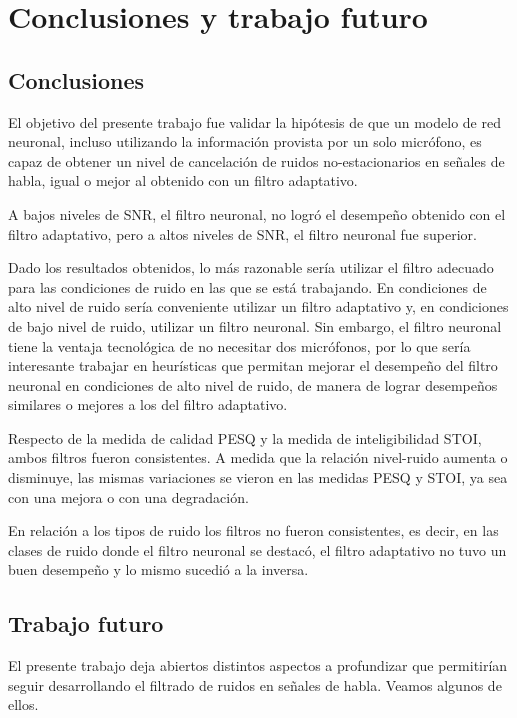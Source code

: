 \section{Conclusiones y trabajo futuro}

\subsection{Conclusiones}

El objetivo del presente trabajo fue validar la hipótesis de que un modelo de red neuronal, incluso utilizando la información provista por un solo micrófono, es capaz de obtener un nivel de cancelación de ruidos no-estacionarios en señales de habla, igual o mejor al obtenido con un filtro adaptativo.

A bajos niveles de SNR, el filtro neuronal, no logró el desempeño obtenido con el filtro adaptativo, pero a altos niveles de SNR, el filtro neuronal fue superior.

Dado los resultados obtenidos, lo más razonable sería utilizar el filtro adecuado para las condiciones de ruido en las que se está trabajando. En condiciones de alto nivel de ruido sería conveniente utilizar un filtro adaptativo y, en condiciones de bajo nivel de ruido, utilizar un filtro neuronal. Sin embargo, el filtro neuronal tiene la ventaja tecnológica de no necesitar dos micrófonos, por lo que sería interesante trabajar en heurísticas que permitan mejorar el desempeño del filtro neuronal en condiciones de alto nivel de ruido, de manera de lograr desempeños similares o mejores a los del filtro adaptativo.

Respecto de la medida de calidad PESQ y la medida de inteligibilidad STOI, ambos filtros fueron consistentes. A medida que la relación nivel-ruido aumenta o disminuye, las mismas variaciones se vieron en las medidas PESQ y STOI, ya sea con una mejora o con una degradación.

En relación a los tipos de ruido los filtros no fueron consistentes, es decir, en las clases de ruido donde el filtro neuronal se destacó, el filtro adaptativo no tuvo un buen desempeño y lo mismo sucedió a la inversa. 

\subsection{Trabajo futuro}

El presente trabajo deja abiertos distintos aspectos a profundizar que permitirían seguir desarrollando el filtrado de ruidos en señales de habla. Veamos algunos de ellos.

